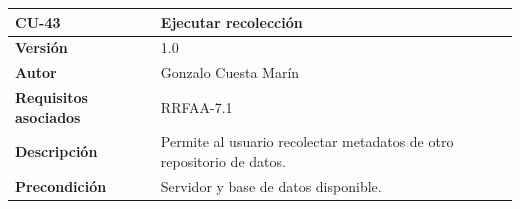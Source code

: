 \documentclass[
]{article}
\begin{document}
\begin{longtable}[]{@{}ll@{}}
\toprule
\begin{minipage}[b]{0.18\columnwidth}\raggedright
\textbf{CU-43}\strut
\end{minipage} & \begin{minipage}[b]{0.76\columnwidth}\raggedright
\textbf{Ejecutar recolección}\strut
\end{minipage}\tabularnewline
\midrule
\endhead
\begin{minipage}[t]{0.18\columnwidth}\raggedright
\textbf{Versión}\strut
\end{minipage} & \begin{minipage}[t]{0.76\columnwidth}\raggedright
1.0\strut
\end{minipage}\tabularnewline
\begin{minipage}[t]{0.18\columnwidth}\raggedright
\textbf{Autor}\strut
\end{minipage} & \begin{minipage}[t]{0.76\columnwidth}\raggedright
Gonzalo Cuesta Marín\strut
\end{minipage}\tabularnewline
\begin{minipage}[t]{0.18\columnwidth}\raggedright
\textbf{Requisitos asociados}\strut
\end{minipage} & \begin{minipage}[t]{0.76\columnwidth}\raggedright
RRFAA-7.1\strut
\end{minipage}\tabularnewline
\begin{minipage}[t]{0.18\columnwidth}\raggedright
\textbf{Descripción}\strut
\end{minipage} & \begin{minipage}[t]{0.76\columnwidth}\raggedright
Permite al usuario recolectar metadatos de otro repositorio de
datos.\strut
\end{minipage}\tabularnewline
\begin{minipage}[t]{0.18\columnwidth}\raggedright
\textbf{Precondición}\strut
\end{minipage} & \begin{minipage}[t]{0.76\columnwidth}\raggedright
Servidor y base de datos disponible.


\end{minipage}
\end{longtable}
\end{document}
